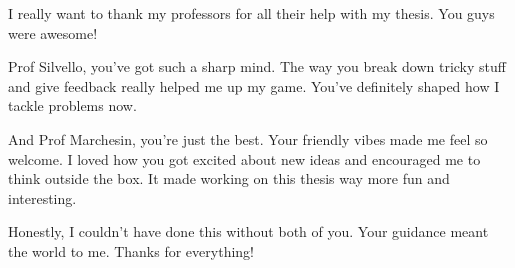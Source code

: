 I really want to thank my professors for all their help with my thesis.
You guys were awesome!

Prof Silvello, you've got such a sharp mind.
The way you break down tricky stuff and give feedback really helped me up my game. You've definitely shaped how I tackle problems now.

And Prof Marchesin, you're just the best.
Your friendly vibes made me feel so welcome.
I loved how you got excited about new ideas and encouraged me to think outside the box.
It made working on this thesis way more fun and interesting.

Honestly, I couldn't have done this without both of you.
Your guidance meant the world to me.
Thanks for everything!